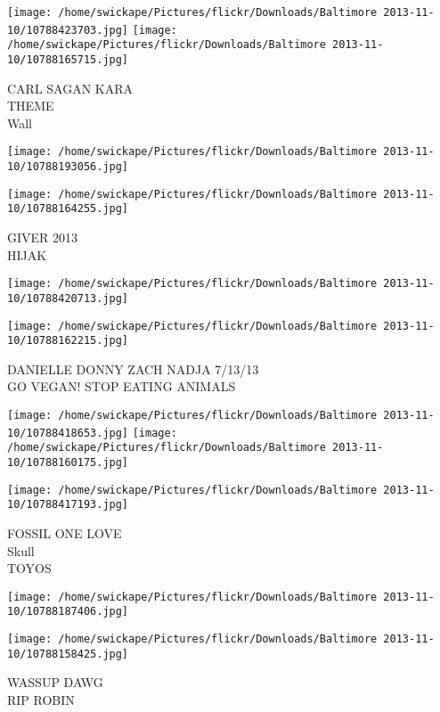 \documentclass[10pt,letterpaper]{article}
\begin{document}
\vspace{0.25in}
\texttt{[image: /home/swickape/Pictures/flickr/Downloads/Baltimore 2013-11-10/10788423703.jpg]}
\texttt{[image: /home/swickape/Pictures/flickr/Downloads/Baltimore 2013-11-10/10788165715.jpg]}

CARL SAGAN KARA\\
THEME\\
Wall
\pagebreak

\texttt{[image: /home/swickape/Pictures/flickr/Downloads/Baltimore 2013-11-10/10788193056.jpg]}

\vspace{0.25in}
\texttt{[image: /home/swickape/Pictures/flickr/Downloads/Baltimore 2013-11-10/10788164255.jpg]}

GIVER 2013\\
HIJAK
\pagebreak

\texttt{[image: /home/swickape/Pictures/flickr/Downloads/Baltimore 2013-11-10/10788420713.jpg]}

\vspace{0.25in}
\texttt{[image: /home/swickape/Pictures/flickr/Downloads/Baltimore 2013-11-10/10788162215.jpg]}

DANIELLE DONNY ZACH NADJA 7/13/13\\
GO VEGAN! STOP EATING ANIMALS
\pagebreak

\texttt{[image: /home/swickape/Pictures/flickr/Downloads/Baltimore 2013-11-10/10788418653.jpg]}
\texttt{[image: /home/swickape/Pictures/flickr/Downloads/Baltimore 2013-11-10/10788160175.jpg]}

\vspace{0.25in}
\texttt{[image: /home/swickape/Pictures/flickr/Downloads/Baltimore 2013-11-10/10788417193.jpg]}

FOSSIL ONE LOVE\\
Skull\\
TOYOS
\pagebreak

\texttt{[image: /home/swickape/Pictures/flickr/Downloads/Baltimore 2013-11-10/10788187406.jpg]}

\vspace{0.25in}
\texttt{[image: /home/swickape/Pictures/flickr/Downloads/Baltimore 2013-11-10/10788158425.jpg]}

WASSUP DAWG\\
RIP ROBIN
\pagebreak
\end{document}
